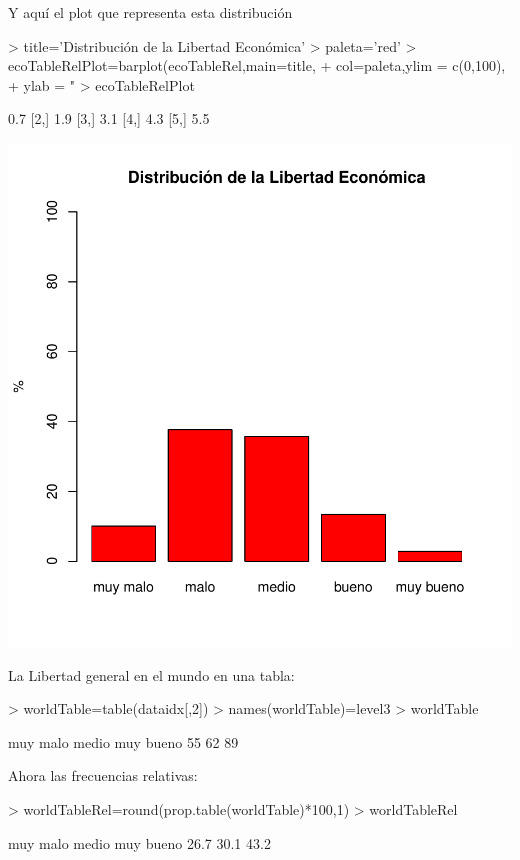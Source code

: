 \documentclass{article}
\begin{document}
Y aquí el plot que representa esta distribución
\begin{Schunk}
\begin{Sinput}
> title='Distribución de la Libertad Económica'
> paleta='red'
> ecoTableRelPlot=barplot(ecoTableRel,main=title,
+                         col=paleta,ylim = c(0,100),
+                         ylab = "%
> ecoTableRelPlot
\end{Sinput}
\begin{Soutput}
     [,1]
[1,]  0.7
[2,]  1.9
[3,]  3.1
[4,]  4.3
[5,]  5.5
\end{Soutput}
\end{Schunk}
\includegraphics{version_0-ecoTableRelPlot}


La Libertad general en el mundo en una tabla:
\begin{Schunk}
\begin{Sinput}
> worldTable=table(dataidx[,2])
> names(worldTable)=level3
> worldTable
\end{Sinput}
\begin{Soutput}
 muy malo     medio muy bueno 
       55        62        89 
\end{Soutput}
\end{Schunk}


Ahora las frecuencias relativas:
\begin{Schunk}
\begin{Sinput}
> worldTableRel=round(prop.table(worldTable)*100,1)
> worldTableRel
\end{Sinput}
\begin{Soutput}
 muy malo     medio muy bueno 
     26.7      30.1      43.2 
\end{Soutput}
\end{Schunk}
\end{document}
